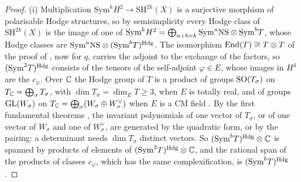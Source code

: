 \begin{proof}
(i) Multiplication $\mathrm{Sym}^{k}H^{2}\to\mathrm{SH}^{2k}(X)$ is a
surjective morphism of polarisable Hodge structures, so by semisimplicity
every Hodge class of $\mathrm{SH}^{2k}(X)$ is the image of one of
$\mathrm{Sym}^{k}H^{2}=\bigoplus_{a+b=k}\mathrm{Sym}^{a}\mathrm{NS}\otimes
\mathrm{Sym}^{b}T$, whose Hodge classes are
$\mathrm{Sym}^{a}\mathrm{NS}\otimes(\mathrm{Sym}^{b}T)^{\mathrm{Hdg}}$. The isomorphism
$\operatorname{End}(T)\cong T\otimes T$ of the proof of , now for $q$,
carries the adjoint to the exchange of the factors, so
$(\mathrm{Sym}^{2}T)^{\mathrm{Hdg}}$ consists of the tensors of the self-adjoint
$\varphi\in E$, whose images in $H^{4}$ are the $c_{\varphi}$. Over $\mathbb{C}$ the
Hodge group of $T$ is a product of groups $\operatorname{SO}(T_{\sigma})$ on
$T_{\mathbb{C}}=\bigoplus_{\sigma}T_{\sigma}$, with $\dim T_{\sigma}=\dim_{E}T\ge3$,
when $E$ is totally real, and of groups $\operatorname{GL}(W_{\sigma})$ on
$T_{\mathbb{C}}=\bigoplus_{\sigma}(W_{\sigma}\oplus W_{\sigma}^{\vee})$ when $E$ is a
CM field \cite{Zar83}. By the first fundamental theorems
\cite[Chapter~5]{GW09}, the invariant polynomials of one vector of
$T_{\sigma}$, or of one vector of $W_{\sigma}$ and one of $W_{\sigma}^{\vee}$,
are generated by the quadratic form, or by the pairing: a determinant needs
$\dim T_{\sigma}$ distinct vectors. So $(\mathrm{Sym}^{b}T)^{\mathrm{Hdg}}\otimes\mathbb{C}$
is spanned by products of elements of $(\mathrm{Sym}^{2}T)^{\mathrm{Hdg}}\otimes\mathbb{C}$,
and the rational span of the products of classes $c_{\varphi}$, which has the
same complexification, is $(\mathrm{Sym}^{b}T)^{\mathrm{Hdg}}$.


\end{proof}
